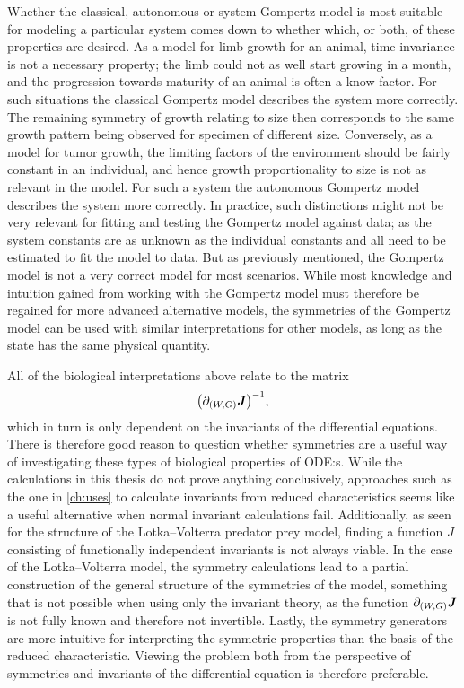Whether the classical, autonomous or system Gompertz model is most suitable for modeling a particular system comes down to whether which, or both, of these properties are desired.
As a model for limb growth for an animal, time invariance is not a necessary property; the limb could not as well start growing in a month, and the progression towards maturity of an animal is often a know factor.
For such situations the classical Gompertz model describes the system more correctly.
The remaining symmetry of growth relating to size then corresponds to the same growth pattern being observed for specimen of different size.
Conversely, as a model for tumor growth, the limiting factors of the environment should be fairly constant in an individual, and hence growth proportionality to size is not as relevant in the model.
For such a system the autonomous Gompertz model describes the system more correctly.
In practice, such distinctions might not be very relevant for fitting and testing the Gompertz model against data; as the system constants are as unknown as the individual constants and all need to be estimated to fit the model to data.
But as previously mentioned, the Gompertz model is not a very correct model for most scenarios.
While most knowledge and intuition gained from working with the Gompertz model must therefore be regained for more advanced alternative models, the symmetries of the Gompertz model can be used with similar interpretations for other models, as long as the state has the same physical quantity. %

All of the biological interpretations above relate to the matrix
\begin{equation*}
  \left(\partial_{(W, G)} \vect{J}\right)^{-1},
\end{equation*}
which in turn is only dependent on the invariants of the differential equations.
There is therefore good reason to question whether symmetries are a useful way of investigating these types of biological properties of ODE:s.
While the calculations in this thesis do not prove anything conclusively, approaches such as the one in \cref{ch:uses} to calculate invariants from reduced characteristics seems like a useful alternative when normal invariant calculations fail.
Additionally, as seen for the structure of the Lotka--Volterra predator prey model, finding a function \(J\) consisting of functionally independent invariants is not always viable.
In the case of the Lotka--Volterra model, the symmetry calculations lead to a partial construction of the general structure of the symmetries of the model, something that is not possible when using only the invariant theory, as the function \(\partial_{(W, G)} \boldsymbol{J}\) is not fully known and therefore not invertible.
Lastly, the symmetry generators are more intuitive for interpreting the symmetric properties than the basis of the reduced characteristic.
Viewing the problem both from the perspective of symmetries and invariants of the differential equation is therefore preferable.

